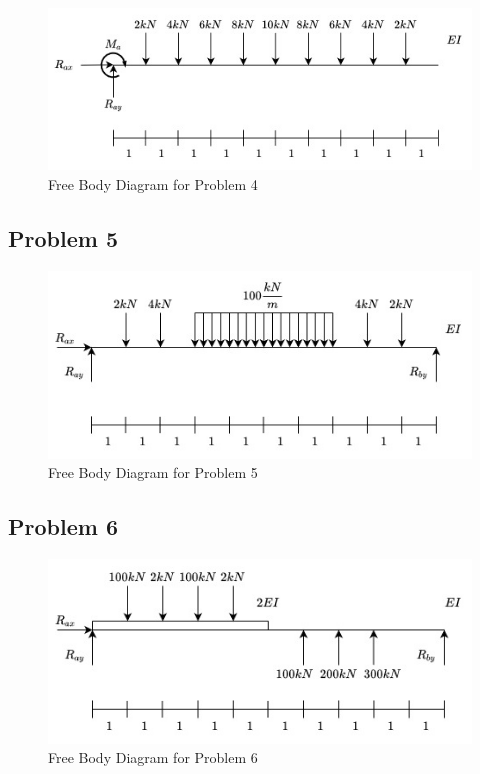 \documentclass[a4paper]{article}
\begin{document}
\begin{figure}[h]
\includegraphics[width=\textwidth]{FBD/FBD_4.jpg}
\caption{Free Body Diagram for Problem 4}
\label{FBD_4}
\end{figure}

\subsection{Problem 5}

\begin{figure}[h]
\includegraphics[width=\textwidth]{FBD/FBD_5.jpg}
\caption{Free Body Diagram for Problem 5}
\label{FBD_5}
\end{figure}

\subsection{Problem 6}

\begin{figure}[h]
\includegraphics[width=\textwidth]{FBD/FBD_6.jpg}
\caption{Free Body Diagram for Problem 6}
\label{FBD_6}
\end{figure}
\end{document}
